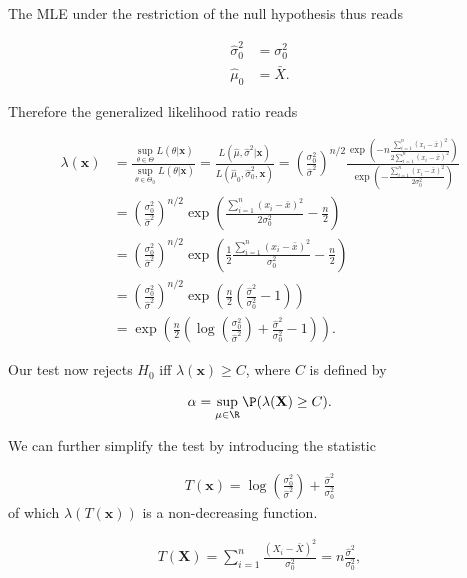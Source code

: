 \begin{solution}
The MLE under the restriction of the null hypothesis thus reads

\begin{align*}
  \hat{\sigma}_0^2 &= \sigma_0^2 \\
  \hat{\mu}_0 &= \bar{X}.
\end{align*}

Therefore the generalized likelihood ratio reads

\begin{align*}
  \lambda(\textbf{x}) &= \frac{\sup_{\theta \in \Theta} L(\theta | \textbf{x})}{\sup_{\theta \in \Theta_0} L(\theta | \textbf{x})}
  = \frac{L(\hat{\mu}, \hat{\sigma}^2 | \textbf{x})}{L(\hat{\mu}_0, \hat{\sigma}^2_0, \textbf{x})} 
  = \left(\frac{\sigma_0^2}{\hat{\sigma}^2}\right)^{n/2}\frac{\exp\left(-n\frac{\sum_{i=1}^n(x_i - \bar{x})^2}{2\sum_{i=1}^n (x_i - \bar{x})^2}\right)}
  {\exp\left(-\frac{\sum_{i=1}^n (x_i - \bar{x})^2}{2\sigma_0^2}\right)} \\
  &= \left(\frac{\sigma_0^2}{\hat{\sigma}^2}\right)^{n/2}\exp\left(\frac{\sum_{i=1}^n (x_i - \bar{x})^2}{2\sigma_0^2}-\frac{n}{2}\right) \\
  &= \left(\frac{\sigma_0^2}{\hat{\sigma}^2}\right)^{n/2}\exp\left(\frac{1}{2}\frac{\sum_{i=1}^n (x_i - \bar{x})^2}{\sigma_0^2}-\frac{n}{2}\right) \\
  &= \left(\frac{\sigma_0^2}{\hat{\sigma}^2}\right)^{n/2}\exp\left(\frac{n}{2}\left(\frac{\hat{\sigma}^2}{\sigma_0^2}-1\right)\right) \\
  &= \exp\left(\frac{n}{2}\left(\log\left(\frac{\sigma_0^2}{\hat{\sigma}^2}\right) + \frac{\hat{\sigma}^2}{\sigma_0^2}-1\right)\right).
\end{align*}

Our test now rejects $H_0$ iff $\lambda(\textbf{x}) \geq C$, where $C$ is defined by

\begin{align*}
  \alpha = \sup_{\mu \in \R} \P(\lambda(\textbf{X}) \geq C).
\end{align*}

We can further simplify the test by introducing the statistic 

\begin{align*}
  T(\textbf{x}) = \log\left(\frac{\sigma_0^2}{\hat{\sigma}^2}\right) + \frac{\hat{\sigma}^2}{\sigma_0^2}
\end{align*}
of which $\lambda(T(\textbf{x}))$ is a non-decreasing function.

\begin{align*}
  T(\textbf{X}) = \sum_{i=1}^n \frac{(X_i - \bar{X})^2}{\sigma_0^2} = n\frac{\hat{\sigma}^2}{\sigma_0^2},
\end{align*}


\end{solution}
